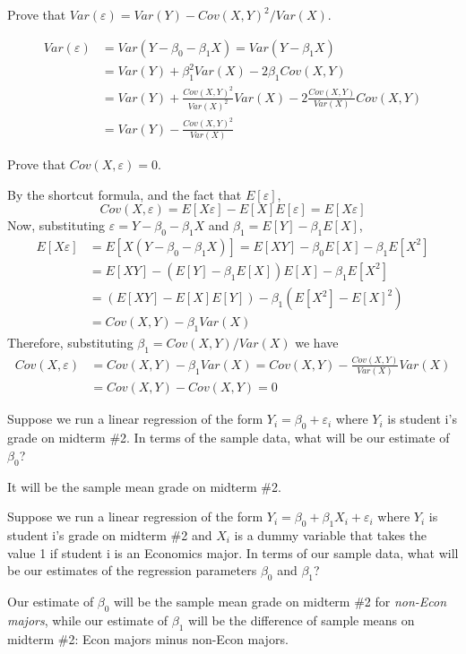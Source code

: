 \documentclass[addpoints,12pt]{exam}
\begin{document}
\begin{questions}
\question Prove that $Var(\varepsilon) = Var(Y) - Cov(X,Y)^2/Var(X)$.
\begin{solution}
  \begin{align*}
    Var(\varepsilon) &= Var\left( Y - \beta_0 - \beta_1 X \right) = Var(Y - \beta_1 X) \\
    &= Var(Y) + \beta_1^2 Var(X) -2\beta_1 Cov(X,Y)\\
    &= Var(Y) + \frac{Cov(X,Y)^2}{Var(X)^2} Var(X) -2\frac{Cov(X,Y)}{Var(X)} Cov(X,Y)\\
    &= Var(Y) - \frac{Cov(X,Y)^2}{Var(X)}
  \end{align*}
\end{solution}

\question Prove that $Cov(X,\varepsilon) = 0$.
\begin{solution}
  By the shortcut formula, and the fact that $E[\varepsilon]$,
  \[
    Cov(X, \varepsilon) = E[X\varepsilon] - E[X]E[\varepsilon] = E[X\varepsilon]
  \]
  Now, substituting $\varepsilon = Y - \beta_0 - \beta_1 X$ and $\beta_1 = E[Y] - \beta_1 E[X]$, 
  \begin{align*}
    E[X\varepsilon] &= E[X(Y - \beta_0 - \beta_1 X)] = E[XY] - \beta_0 E[X] - \beta_1 E[X^2] \\
    &= E[XY] - \left(E[Y] - \beta_1 E[X]\right)E[X] - \beta_1 E[X^2]\\
    &= \left( E[XY] - E[X]E[Y] \right) - \beta_1 \left( E[X^2] - E[X]^2 \right)\\
    &= Cov(X,Y) - \beta_1 Var(X)
  \end{align*}
  Therefore, substituting $\beta_1 = Cov(X,Y)/Var(X)$ we have
  \begin{align*}
    Cov(X,\varepsilon) &= Cov(X,Y) - \beta_1 Var(X) = Cov(X,Y) - \frac{Cov(X,Y)}{Var(X)} Var(X)\\
    &= Cov(X,Y) - Cov(X,Y) = 0
  \end{align*}
\end{solution}


\question Suppose we run a linear regression of the form $Y_i = \beta_0 + \varepsilon_i$ where $Y_i$ is student i's grade on midterm \#2. In terms of the sample data, what will be our estimate of $\beta_0$?
\begin{solution}
  It will be the sample mean grade on midterm \#2.
\end{solution}

\question Suppose we run a linear regression of the form $Y_i = \beta_0 + \beta_1 X_i + \varepsilon_i$ where $Y_i$ is student i's grade on midterm \#2 and $X_i$ is a dummy variable that takes the value 1 if student i is an Economics major. In terms of our sample data, what will be our estimates of the regression parameters $\beta_0$ and $\beta_1$?
\begin{solution}
  Our estimate of $\beta_0$ will be the sample mean grade on midterm \#2 for \emph{non-Econ majors}, while our estimate of $\beta_1$ will be the difference of sample means on midterm \#2: Econ majors minus non-Econ majors.
\end{solution}


\end{questions}
\end{document}
